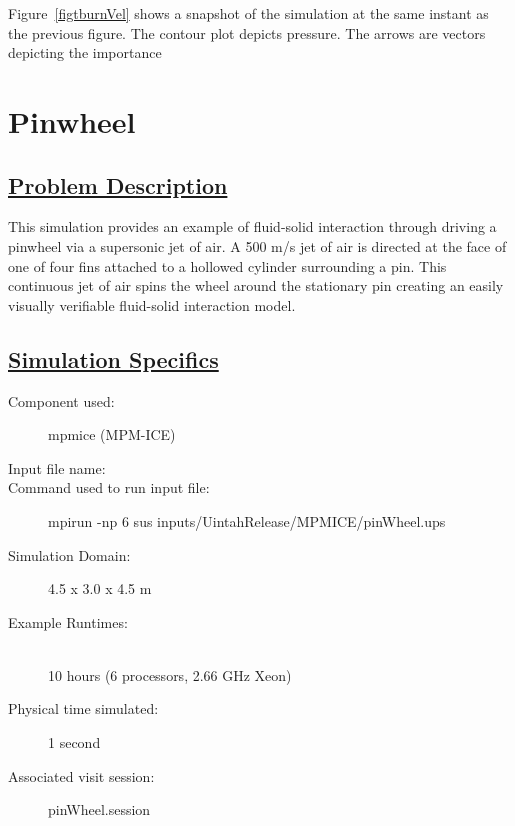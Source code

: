 Figure~\ref{figtburnVel} shows a snapshot of the simulation at the same instant as the 
previous figure.  The contour plot depicts pressure.  The arrows are vectors depicting
the importance   


%
\iffalse           
\newpage
\section*{\center  Pinwheel}
\subsection*{\underline{Problem Description}}
This simulation provides an example of fluid-solid interaction through driving a pinwheel via a supersonic jet of air. A 500 m/s jet of air is directed at the face of one of four fins attached to a hollowed cylinder surrounding a pin. This continuous jet of air spins the wheel around the stationary pin creating an easily visually verifiable fluid-solid interaction model. 

\subsection*{\underline{Simulation Specifics}}
\begin{description}
\item [Component used:] \hfill mpmice (MPM-ICE)
\item [Input file name:] \hfill {}
\item [Command used to run input file:]\hfill 
mpirun -np 6 sus inputs/UintahRelease/MPMICE/pinWheel.ups

\item [Simulation Domain:]\hfill    4.5 x 3.0 x 4.5 m

\item [Example Runtimes:] \hfill \\
 10 hours   (6 processors, 2.66 GHz Xeon)\\

\item [Physical time simulated:] \hfill 1 second \\ 

\item [Associated visit session:] \hfill pinWheel.session

\end{description}

